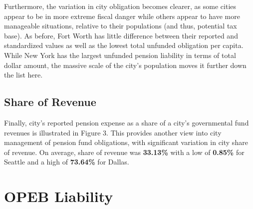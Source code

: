 \documentclass[12pt]{article}
\begin{document}
Furthermore, the variation in city obligation becomes clearer, as some
cities appear to be in more extreme fiscal danger while others appear to
have more manageable situations, relative to their populations (and
thus, potential tax base). As before, Fort Worth has little difference
between their reported and standardized values as well as the lowest
total unfunded obligation per capita. While New York has the largest
unfunded pension liability in terms of total dollar amount, the massive
scale of the city's population moves it further down the list here.

\subsection{Share of Revenue}

Finally, city's reported pension expense as a share of a city's governmental fund revenues is illustrated in Figure 3.
This provides another view into city management of pension fund
obligations, with significant variation in city share of revenue. On average, share of revenue was
\textbf{33.13\%} with a low of \textbf{0.85\%} for Seattle and a high of
\textbf{73.64\%} for Dallas.

\begin{figure}
  \label{fig:key}
\end{figure}

\section{OPEB Liability}
\end{document}
